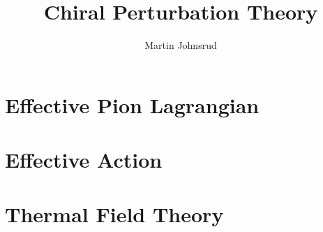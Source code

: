 \documentclass{article}
\title{Chiral Perturbation Theory}
\author{Martin Johnsrud}
\begin{document}
\maketitle 

\section{Effective Pion Lagrangian}
\label{serction:effective_pion_lagrangian}





\section{Effective Action}







\section{Thermal Field Theory}












\end{document}
